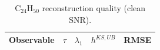 \begin{table}[ht]
\centering
\begin{tabular}{lrccc}
\hline
Observable & $\tau$ & $\lambda_1$ & $h^{KS,UB}$ & RMSE \\
\hline
\hline
\end{tabular}
\caption{$\mathrm{C}_{24}\mathrm{H}_{50}$ reconstruction quality (clean SNR).}
\label{tab:c24h50}
\end{table}
